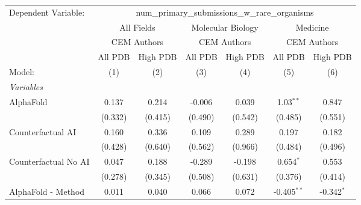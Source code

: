 \begingroup
\centering
\begin{tabular}{lcccccc}
   \tabularnewline \midrule \midrule
   Dependent Variable: & \multicolumn{6}{c}{num\_primary\_submissions\_w\_rare\_organisms}\\
 & \multicolumn{2}{c}{All Fields} & \multicolumn{2}{c}{Molecular Biology} & \multicolumn{2}{c}{Medicine} \\
\cmidrule(lr){2-3} \cmidrule(lr){4-5} \cmidrule(lr){6-7}
 & \multicolumn{2}{c}{CEM Authors} & \multicolumn{2}{c}{CEM Authors} & \multicolumn{2}{c}{CEM Authors} \\
\cmidrule(lr){2-3} \cmidrule(lr){4-5} \cmidrule(lr){6-7}
 & \multicolumn{1}{c}{All PDB} & \multicolumn{1}{c}{High PDB} & \multicolumn{1}{c}{All PDB} & \multicolumn{1}{c}{High PDB} & \multicolumn{1}{c}{All PDB} & \multicolumn{1}{c}{High PDB} \\
\cmidrule(lr){2-2} \cmidrule(lr){3-3} \cmidrule(lr){4-4} \cmidrule(lr){5-5} \cmidrule(lr){6-6} \cmidrule(lr){7-7}
   Model:                                                     & (1)           & (2)           & (3)           & (4)           & (5)           & (6)\\  
   \midrule
   \emph{Variables}\\
   AlphaFold                                                  & 0.137         & 0.214         & -0.006        & 0.039         & 1.03$^{**}$   & 0.847\\   
                                                              & (0.332)       & (0.415)       & (0.490)       & (0.542)       & (0.485)       & (0.551)\\   
   Counterfactual AI                                          & 0.160         & 0.336         & 0.109         & 0.289         & 0.197         & 0.182\\   
                                                              & (0.428)       & (0.640)       & (0.562)       & (0.966)       & (0.484)       & (0.496)\\   
   Counterfactual No AI                                       & 0.047         & 0.188         & -0.289        & -0.198        & 0.654$^{*}$   & 0.553\\   
                                                              & (0.278)       & (0.345)       & (0.508)       & (0.631)       & (0.376)       & (0.414)\\   
   AlphaFold - Method                                         & 0.011         & 0.040         & 0.066         & 0.072         & -0.405$^{**}$ & -0.342$^{*}$\\   

\end{tabular}
